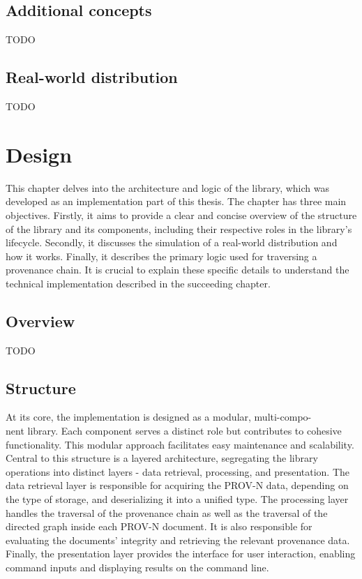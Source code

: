 \documentclass[
  digital,     %
  oneside,     %
  nosansbold,  %
  nocolorbold, %
  lof,         %
  lot,         %
]{fithesis4}
\begin{document}
\section{Additional concepts}
TODO

\section{Real-world distribution}
TODO


\chapter{Design}
\shorthandoff{-}
This chapter delves into the architecture and logic of the library, which was developed as an implementation part of this thesis. The chapter has three main objectives. Firstly, it aims to provide a clear and concise overview of the structure of the library and its components, including their respective roles in the library's lifecycle. Secondly, it discusses the simulation of a real-world distribution and how it works. Finally, it describes the primary logic used for traversing a provenance chain. It is crucial to explain these specific details to understand the technical implementation described in the succeeding chapter. 
\shorthandon{-}

\section{Overview}
TODO

\section{Structure}
\shorthandoff{-}
At its core, the implementation is designed as a modular, multi-compo-\\nent library. Each component serves a distinct role but contributes to cohesive functionality. This modular approach facilitates easy maintenance and scalability. Central to this structure is a layered architecture, segregating the library operations into distinct layers - data retrieval, processing, and presentation. 
The data retrieval layer is responsible for acquiring the PROV-N data, depending on the type of storage, and deserializing it into a unified type. 
The processing layer handles the traversal of the provenance chain as well as the traversal of the directed graph inside each PROV-N document. It is also responsible for evaluating the documents' integrity and retrieving the relevant provenance data.
Finally, the presentation layer provides the interface for user interaction, enabling command inputs and displaying results on the command line.
\shorthandon{-}
\end{document}
